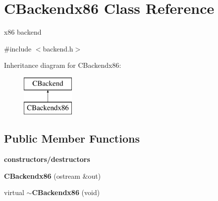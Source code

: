 \hypertarget{classCBackendx86}{\section{C\-Backendx86 Class Reference}
\label{classCBackendx86}
}


x86 backend  




{\ttfamily \#include $<$backend.\-h$>$}

Inheritance diagram for C\-Backendx86\-:\begin{figure}[H]
\begin{center}
\leavevmode
\includegraphics[height=2.000000cm]{classCBackendx86}
\end{center}
\end{figure}
\subsection*{Public Member Functions}
\begin{Indent}{\bf constructors/destructors}\par
\begin{DoxyCompactItemize}
\item 
\hypertarget{classCBackendx86_a206ef50ab62a43a5e7959b91b2758711}{{\bfseries C\-Backendx86} (ostream \&out)}\label{classCBackendx86_a206ef50ab62a43a5e7959b91b2758711}

\item 
\hypertarget{classCBackendx86_afa6d6c74ee32253b7445c00b2a000156}{virtual {\bfseries $\sim$\-C\-Backendx86} (void)}\label{classCBackendx86_afa6d6c74ee32253b7445c00b2a000156}

\end{DoxyCompactItemize}
\end{Indent}
